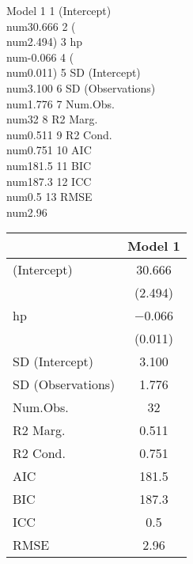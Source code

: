                             Model 1
1        (Intercept)  \\num{30.666}
2                    (\\num{2.494})
3                 hp  \\num{-0.066}
4                    (\\num{0.011})
5     SD (Intercept)   \\num{3.100}
6  SD (Observations)   \\num{1.776}
7           Num.Obs.      \\num{32}
8           R2 Marg.   \\num{0.511}
9           R2 Cond.   \\num{0.751}
10               AIC   \\num{181.5}
11               BIC   \\num{187.3}
12               ICC     \\num{0.5}
13              RMSE    \\num{2.96}
\begin{table}
\centering
\begin{tabular}[t]{lc}
\toprule
  & Model 1\\
\midrule
(Intercept) & \num{30.666}\\
 & (\num{2.494})\\
hp & \num{-0.066}\\
 & (\num{0.011})\\
SD (Intercept) & \num{3.100}\\
SD (Observations) & \num{1.776}\\
Num.Obs. & \num{32}\\
R2 Marg. & \num{0.511}\\
\midrule
R2 Cond. & \num{0.751}\\
AIC & \num{181.5}\\
BIC & \num{187.3}\\
ICC & \num{0.5}\\
RMSE & \num{2.96}\\
\bottomrule
\end{tabular}
\end{table}
